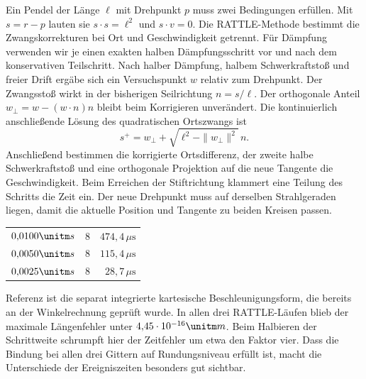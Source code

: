 Ein Pendel der Länge \(\ell\) mit Drehpunkt \(p\) muss zwei Bedingungen erfüllen. Mit \(s=r-p\) lauten sie \(s\cdot s=\ell^2\) und \(s\cdot v=0\). Die RATTLE-Methode bestimmt die Zwangskorrekturen bei Ort und Geschwindigkeit getrennt. Für Dämpfung verwenden wir je einen exakten halben Dämpfungsschritt vor und nach dem konservativen Teilschritt.
Nach halber Dämpfung, halbem Schwerkraftstoß und freier Drift ergäbe sich ein Versuchspunkt \(w\) relativ zum Drehpunkt. Der Zwangsstoß wirkt in der bisherigen Seilrichtung \(n=s/\ell\). Der orthogonale Anteil \(w_\perp=w-(w\cdot n)n\) bleibt beim Korrigieren unverändert. Die kontinuierlich anschließende Lösung des quadratischen Ortszwangs ist
\[
 s^+=w_\perp+\sqrt{\ell^2-\|w_\perp\|^2}\,n .
\]
Anschließend bestimmen die korrigierte Ortsdifferenz, der zweite halbe Schwerkraftstoß und eine orthogonale Projektion auf die neue Tangente die Geschwindigkeit. Beim Erreichen der Stiftrichtung klammert eine Teilung des Schritts die Zeit ein. Der neue Drehpunkt muss auf derselben Strahlgeraden liegen, damit die aktuelle Position und Tangente zu beiden Kreisen passen.
{\tblstart\begin{tabularx}{\linewidth}{@{}Yrr@{}}\toprule
{}&&\\\midrule
\(0{,}0100\unitm s\)&8&\(474{,}4\,\mu\mathrm s\)\\
\(0{,}0050\unitm s\)&8&\(115{,}4\,\mu\mathrm s\)\\
\(0{,}0025\unitm s\)&8&\(28{,}7\,\mu\mathrm s\)\\\bottomrule\end{tabularx}\par}
Referenz ist die separat integrierte kartesische Beschleunigungsform, die bereits an der Winkelrechnung geprüft wurde. In allen drei RATTLE-Läufen blieb der maximale Längenfehler unter \(4{,}45\cdot10^{-16}\unitm m\). Beim Halbieren der Schrittweite schrumpft hier der Zeitfehler um etwa den Faktor vier. Dass die Bindung bei allen drei Gittern auf Rundungsniveau erfüllt ist, macht die Unterschiede der Ereigniszeiten besonders gut sichtbar.
